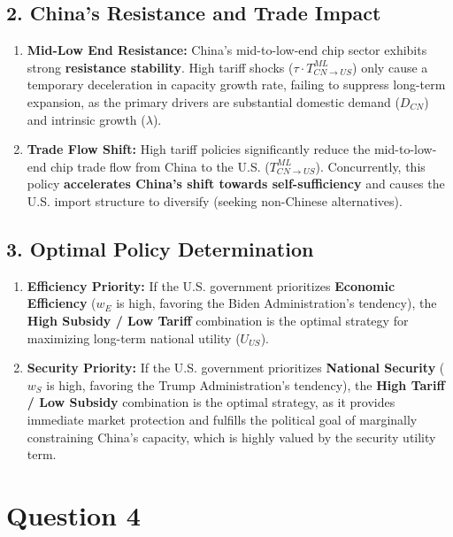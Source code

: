 \documentclass{apmcmthesis}
\begin{document}
\subsection*{2. China's Resistance and Trade Impact}

\begin{enumerate}
    \item \textbf{Mid-Low End Resistance:} China's mid-to-low-end chip sector exhibits strong \textbf{resistance stability}. High tariff shocks ($\tau \cdot T_{CN \to US}^{ML}$) only cause a temporary deceleration in capacity growth rate, failing to suppress long-term expansion, as the primary drivers are substantial domestic demand ($D_{CN}$) and intrinsic growth ($\lambda$).
    \item \textbf{Trade Flow Shift:} High tariff policies significantly reduce the mid-to-low-end chip trade flow from China to the U.S. ($T_{CN \to US}^{ML}$). Concurrently, this policy \textbf{accelerates China's shift towards self-sufficiency} and causes the U.S. import structure to diversify (seeking non-Chinese alternatives).
\end{enumerate}

\subsection*{3. Optimal Policy Determination}

\begin{enumerate}
    \item \textbf{Efficiency Priority:} If the U.S. government prioritizes \textbf{Economic Efficiency} ($w_E$ is high, favoring the Biden Administration's tendency), the \textbf{High Subsidy / Low Tariff} combination is the optimal strategy for maximizing long-term national utility ($U_{US}$).
    \item \textbf{Security Priority:} If the U.S. government prioritizes \textbf{National Security} ($w_S$ is high, favoring the Trump Administration's tendency), the \textbf{High Tariff / Low Subsidy} combination is the optimal strategy, as it provides immediate market protection and fulfills the political goal of marginally constraining China's capacity, which is highly valued by the security utility term.
\end{enumerate}
\section{Question 4}
\end{document}
